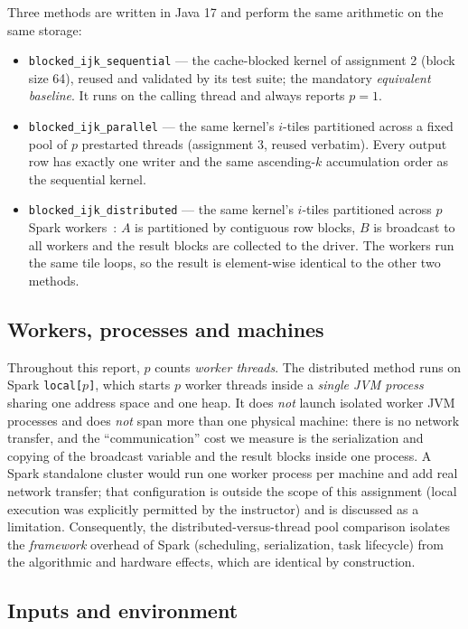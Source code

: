 \documentclass[11pt,a4paper]{article}
\begin{document}
Three methods are written in Java 17 and perform the same arithmetic on the
same storage:
\begin{itemize}
    \item \texttt{blocked\_ijk\_sequential} --- the cache-blocked kernel of
    assignment 2 (block size 64), reused and validated by its test suite;
    the mandatory \emph{equivalent baseline}. It runs on the calling thread
    and always reports $p = 1$.
    \item \texttt{blocked\_ijk\_parallel} --- the same kernel's $i$-tiles
    partitioned across a fixed pool of $p$ prestarted threads (assignment 3,
    reused verbatim). Every output row has exactly one writer and the same
    ascending-$k$ accumulation order as the sequential kernel.
    \item \texttt{blocked\_ijk\_distributed} --- the same kernel's $i$-tiles
    partitioned across $p$ Spark workers~\cite{spark2024}: $A$ is
    partitioned by contiguous row blocks, $B$ is broadcast to all workers
    and the result blocks are collected to the driver. The workers run the
    same tile loops, so the result is element-wise identical to the other
    two methods.
\end{itemize}

\subsection{Workers, processes and machines}
\label{sec:workers}

Throughout this report, $p$ counts \emph{worker threads}. The distributed
method runs on Spark \texttt{local[$p$]}, which starts $p$ worker threads
inside a \emph{single JVM process} sharing one address space and one heap.
It does \emph{not} launch isolated worker JVM processes and does \emph{not}
span more than one physical machine: there is no network transfer, and the
``communication'' cost we measure is the serialization and copying of the
broadcast variable and the result blocks inside one process. A Spark
standalone cluster would run one worker process per machine and add real
network transfer; that configuration is outside the scope of this
assignment (local execution was explicitly permitted by the instructor) and
is discussed as a limitation. Consequently, the distributed-versus-thread
pool comparison isolates the \emph{framework} overhead of Spark
(scheduling, serialization, task lifecycle) from the algorithmic and
hardware effects, which are identical by construction.

\subsection{Inputs and environment}
\end{document}
